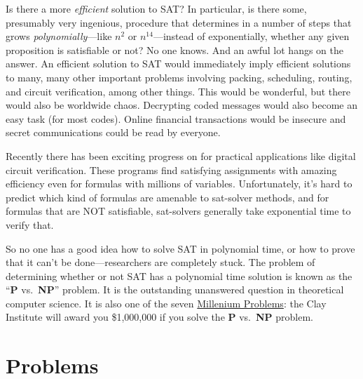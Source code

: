 Is there a more \textit{efficient} solution to SAT?  In particular, is
there some, presumably very ingenious, procedure that determines in a
number of steps that grows \emph{polynomially}---like $n^2$ or
$n^{14}$---instead of exponentially, whether any given proposition is
satisfiable or not?  No one knows.  And an awful lot hangs on the
answer.  An efficient solution to SAT would immediately imply
efficient solutions to many, many other important problems involving
packing, scheduling, routing, and circuit verification, among other
things.  This would be wonderful, but there would also be worldwide
chaos.  Decrypting coded messages would also become an easy task (for
most codes).  Online financial transactions would be insecure and
secret communications could be read by everyone.

Recently there has been exciting progress on  for
practical applications like digital circuit verification.  These
programs find satisfying assignments with amazing efficiency even for
formulas with millions of variables.  Unfortunately, it's hard to
predict which kind of formulas are amenable to sat-solver methods, and
for formulas that are NOT satisfiable, sat-solvers generally take
exponential time to verify that.

So no one has a good idea how to solve SAT in polynomial time, or how
to prove that it can't be done---researchers are completely stuck.
The problem of determining whether or not SAT has a polynomial time
solution is known as the ``\textbf{P} vs.\ \textbf{NP}'' problem.  It
is the outstanding unanswered question in theoretical computer
science.  It is also one of the
seven \href{http://www.claymath.org/millennium/}{Millenium Problems}:
the Clay Institute will award you \$1,000,000 if you solve
the \textbf{P} vs.\ \textbf{NP} problem.

\section{Problems}

\begin{problems}
\classproblems
{}
\homeworkproblems
{}
\end{problems}

\endinput
